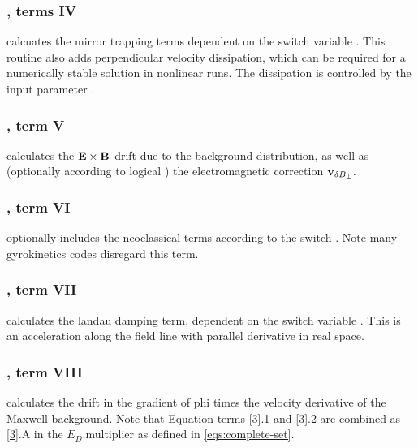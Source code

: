 \subsubsection{, terms IV}
 calcuates the mirror trapping terms dependent on the switch variable .   This routine also adds perpendicular velocity dissipation, which can be required for a numerically stable solution in nonlinear runs. 
The dissipation is controlled by the input parameter .

\subsubsection{, term V}
 calculates the ${\bf E} \times {\bf B}$ drift due to the background distribution, as well as (optionally according to logical ) the electromagnetic correction ${\bf v}_{\delta B_\perp}.$

\subsubsection{, term VI}
 optionally includes the neoclassical terms according to the switch .  Note many gyrokinetics codes disregard this term.

\subsubsection{, term VII}
 calculates the landau damping term, dependent on the switch variable .  This is an acceleration along the field line with parallel derivative in real space.

\subsubsection{, term VIII}
 calculates the  drift in the gradient of phi times the velocity derivative of the Maxwell background.  Note that Equation terms  \ref{3}.1 and \ref{3}.2 are combined as \ref{3}.A in the $E_D$.multiplier as defined in \ref{eqs:complete-set}.

\subsection{} %

